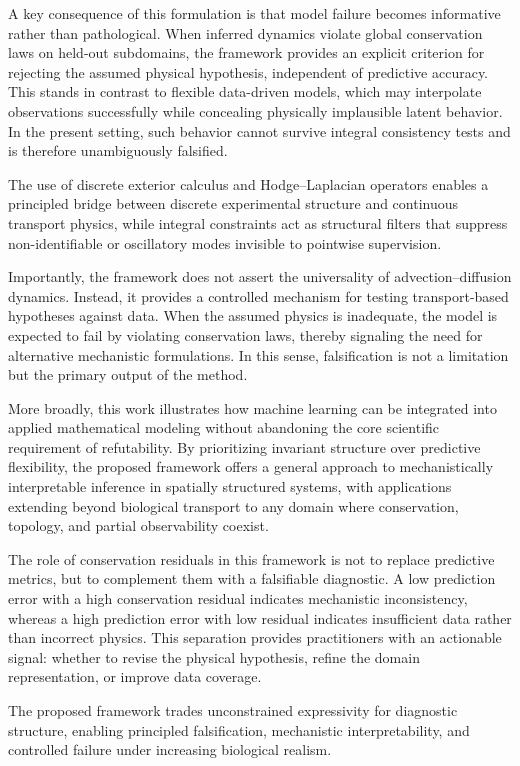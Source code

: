 \documentclass[10pt,article]{article}
\begin{document}
A key consequence of this formulation is that model failure becomes informative rather than pathological. When inferred dynamics violate global conservation laws on held-out subdomains, the framework provides an explicit criterion for rejecting the assumed physical hypothesis, independent of predictive accuracy. This stands in contrast to flexible data-driven models, which may interpolate observations successfully while concealing physically implausible latent behavior. In the present setting, such behavior cannot survive integral consistency tests and is therefore unambiguously falsified.

The use of discrete exterior calculus and Hodge–Laplacian operators enables a principled bridge between discrete experimental structure and continuous transport physics, while integral constraints act as structural filters that suppress non-identifiable or oscillatory modes invisible to pointwise supervision. 

Importantly, the framework does not assert the universality of advection–diffusion dynamics. Instead, it provides a controlled mechanism for testing transport-based hypotheses against data. When the assumed physics is inadequate, the model is expected to fail by violating conservation laws, thereby signaling the need for alternative mechanistic formulations. In this sense, falsification is not a limitation but the primary output of the method.

More broadly, this work illustrates how machine learning can be integrated into applied mathematical modeling without abandoning the core scientific requirement of refutability. By prioritizing invariant structure over predictive flexibility, the proposed framework offers a general approach to mechanistically interpretable inference in spatially structured systems, with applications extending beyond biological transport to any domain where conservation, topology, and partial observability coexist.

The role of conservation residuals in this framework is not to replace predictive metrics, but to complement them with a falsifiable diagnostic. A low prediction error with a high conservation residual indicates mechanistic inconsistency, whereas a high prediction error with low residual indicates insufficient data rather than incorrect physics. This separation provides practitioners with an actionable signal: whether to revise the physical hypothesis, refine the domain representation, or improve data coverage.

The proposed framework trades unconstrained expressivity for diagnostic structure, enabling principled falsification, mechanistic interpretability, and controlled failure under increasing biological realism.
\end{document}
